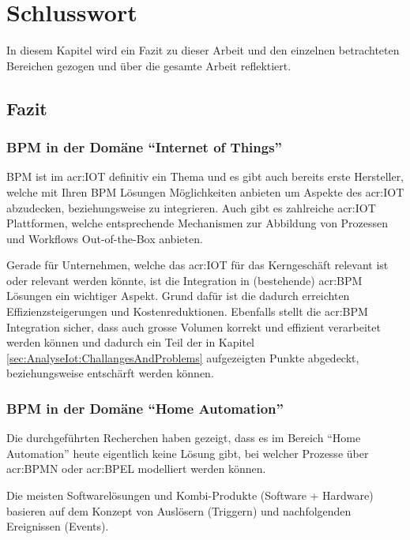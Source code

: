 
\chapter{Schlusswort} \label{chap:Finish}
In diesem Kapitel wird ein Fazit zu dieser Arbeit und den einzelnen betrachteten Bereichen gezogen und über die gesamte Arbeit reflektiert.

\section{Fazit}
\subsection{BPM in der Domäne "`Internet of Things"'}
BPM ist im \gls{acr:IOT} definitiv ein Thema und es gibt auch bereits erste Hersteller, welche mit Ihren BPM Lösungen Möglichkeiten anbieten um Aspekte des \gls{acr:IOT} abzudecken, beziehungsweise zu integrieren. Auch gibt es zahlreiche \gls{acr:IOT} Plattformen, welche entsprechende Mechanismen zur Abbildung von Prozessen und Workflows Out-of-the-Box anbieten.

Gerade für Unternehmen, welche das \gls{acr:IOT} für das Kerngeschäft relevant ist oder relevant werden könnte, ist die Integration in (bestehende) \gls{acr:BPM} Lösungen ein wichtiger Aspekt. Grund dafür ist die dadurch erreichten Effizienzsteigerungen und Kostenreduktionen. Ebenfalls stellt die \gls{acr:BPM} Integration sicher, dass auch grosse Volumen korrekt und effizient verarbeitet werden können und dadurch ein Teil der in Kapitel \ref{sec:AnalyseIot:ChallangesAndProblems}  aufgezeigten Punkte abgedeckt, beziehungsweise entschärft werden können.

\subsection{BPM in der Domäne "`Home Automation"'}
Die durchgeführten Recherchen haben gezeigt, dass es im Bereich "`Home Automation"' heute eigentlich keine Lösung gibt, bei welcher Prozesse über \gls{acr:BPMN} oder \gls{acr:BPEL} modelliert werden können.



Die meisten Softwarelösungen und Kombi-Produkte (Software + Hardware) basieren auf dem Konzept von Auslösern (Triggern) und nachfolgenden Ereignissen (Events).

